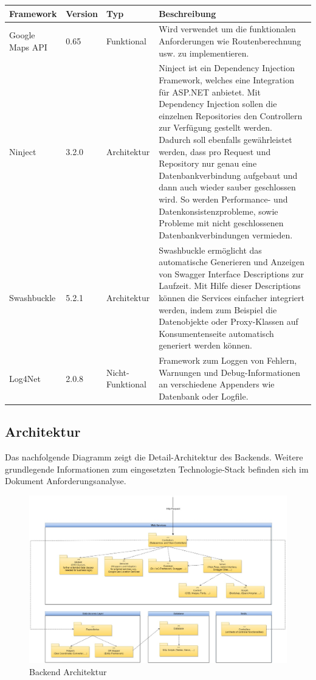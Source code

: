 \documentclass[a4paper,10pt,xetex]{article}
\begin{document}
\begin{longtabu} to \textwidth { | l | l | l | X[l] | }
\hline
\textbf{Framework} & \textbf{Version}  & \textbf{Typ} & \textbf{Beschreibung} \\
\hline
\endhead

Google Maps API &
0.65 &
Funktional &
Wird verwendet um die funktionalen Anforderungen wie Routenberechnung usw. zu
  implementieren.\\\hline
Ninject &
3.2.0 &
Architektur &
Ninject ist ein Dependency Injection Framework, welches eine Integration f\"ur ASP.NET
  anbietet. Mit Dependency Injection sollen die einzelnen Repositories den Controllern zur Verf\"ugung gestellt werden.
  Dadurch soll ebenfalls gew\"ahrleistet werden, dass pro Request und Repository nur genau eine Datenbankverbindung
  aufgebaut und dann auch wieder sauber geschlossen wird. So werden Performance- und Datenkonsistenzprobleme, sowie
  Probleme mit nicht geschlossenen Datenbankverbindungen vermieden.\\\hline
Swashbuckle &
5.2.1 &
Architektur &
Swashbuckle erm\"oglicht das automatische Generieren und Anzeigen von Swagger Interface
  Descriptions zur Laufzeit. Mit Hilfe dieser Descriptions k\"onnen die Services einfacher integriert werden, indem zum
  Beispiel die Datenobjekte oder Proxy-Klassen auf Konsumentenseite automatisch generiert werden k\"onnen.\\\hline
Log4Net &
2.0.8 &
Nicht-Funktional &
Framework zum Loggen von Fehlern, Warnungen und Debug-Informationen an verschiedene
  Appenders wie Datenbank oder Logfile.\\\hline
\end{longtabu}


\subsection{Architektur}\label{backendarchitektur}
Das nachfolgende Diagramm zeigt die Detail-Architektur des Backends. Weitere grundlegende
Informationen zum eingesetzten Technologie-Stack befinden sich im Dokument Anforderungsanalyse.

\begin{figure}
  \centering
  \includegraphics{backend_architektur}
  \caption{Backend Architektur}
\end{figure}
\end{document}
